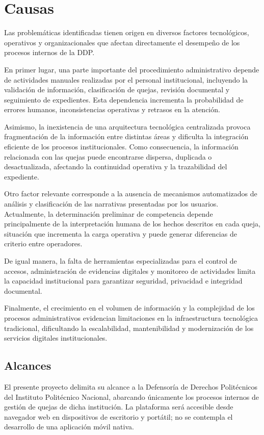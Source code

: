 \section{Causas}

Las problemáticas identificadas tienen origen en diversos factores tecnológicos, operativos y organizacionales que afectan directamente el desempeño de los procesos internos de la DDP.

En primer lugar, una parte importante del procedimiento administrativo depende de actividades manuales realizadas por el personal institucional, incluyendo la validación de información, clasificación de quejas, revisión documental y seguimiento de expedientes. Esta dependencia incrementa la probabilidad de errores humanos, inconsistencias operativas y retrasos en la atención.

Asimismo, la inexistencia de una arquitectura tecnológica centralizada provoca fragmentación de la información entre distintas áreas y dificulta la integración eficiente de los procesos institucionales. Como consecuencia, la información relacionada con las quejas puede encontrarse dispersa, duplicada o desactualizada, afectando la continuidad operativa y la trazabilidad del expediente.

Otro factor relevante corresponde a la ausencia de mecanismos automatizados de análisis y clasificación de las narrativas presentadas por los usuarios. Actualmente, la determinación preliminar de competencia depende principalmente de la interpretación humana de los hechos descritos en cada queja, situación que incrementa la carga operativa y puede generar diferencias de criterio entre operadores.

De igual manera, la falta de herramientas especializadas para el control de accesos, administración de evidencias digitales y monitoreo de actividades limita la capacidad institucional para garantizar seguridad, privacidad e integridad documental.

Finalmente, el crecimiento en el volumen de información y la complejidad de los procesos administrativos evidencian limitaciones en la infraestructura tecnológica tradicional, dificultando la escalabilidad, mantenibilidad y modernización de los servicios digitales institucionales.


\subsection{Alcances}

El presente proyecto delimita su alcance a la Defensoría de Derechos Politécnicos del Instituto Politécnico Nacional, abarcando únicamente los procesos internos de gestión de quejas de dicha institución. La plataforma será accesible desde navegador web en dispositivos de escritorio y portátil; no se contempla el desarrollo de una aplicación móvil nativa.

